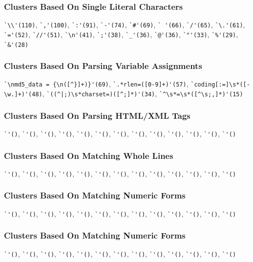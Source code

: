 \subsubsection{Clusters Based On Single Literal Characters}
\verb!`\\'(110)!, \verb!`,'(100)!, \verb!`:'(91)!, \verb!`-'(74)!, \verb!`#'(69)!, \verb!` '(66)!, \verb!`/'(65)!, \verb!`\.'(61)!, \verb!`='(52)!, \verb!`//'(51)!, \verb!`\n'(41)!, \verb!`;'(38)!, \verb!`_'(36)!, \verb!`@'(36)!, \verb!`"'(33)!, \verb!`%'(29)!, \verb!`&'(28)!

\subsubsection{Clusters Based On Parsing Variable Assignments}
\verb!`\nmd5_data = {\n([^}]+)}'(69)!, \verb!`.*rlen=([0-9]+)'(57)!, \verb!`coding[:=]\s*([-\w.]+)'(48)!, \verb!`((^|;)\s*charset=)([^;]*)'(34)!, \verb!`^\s*=\s*([^\s;,]*)'(15)!

\subsubsection{Clusters Based On Parsing HTML/XML Tags}
\verb!`'()!, \verb!`'()!, \verb!`'()!, \verb!`'()!, \verb!`'()!, \verb!`'()!, \verb!`'()!, \verb!`'()!, \verb!`'()!, \verb!`'()!, \verb!`'()!, \verb!`'()!, \verb!`'()!

\subsubsection{Clusters Based On Matching Whole Lines}
\verb!`'()!, \verb!`'()!, \verb!`'()!, \verb!`'()!, \verb!`'()!, \verb!`'()!, \verb!`'()!, \verb!`'()!, \verb!`'()!, \verb!`'()!, \verb!`'()!, \verb!`'()!, \verb!`'()!

\subsubsection{Clusters Based On Matching Numeric Forms}
\verb!`'()!, \verb!`'()!, \verb!`'()!, \verb!`'()!, \verb!`'()!, \verb!`'()!, \verb!`'()!, \verb!`'()!, \verb!`'()!, \verb!`'()!, \verb!`'()!, \verb!`'()!, \verb!`'()!

\subsubsection{Clusters Based On Matching Numeric Forms}
\verb!`'()!, \verb!`'()!, \verb!`'()!, \verb!`'()!, \verb!`'()!, \verb!`'()!, \verb!`'()!, \verb!`'()!, \verb!`'()!, \verb!`'()!, \verb!`'()!, \verb!`'()!, \verb!`'()!

